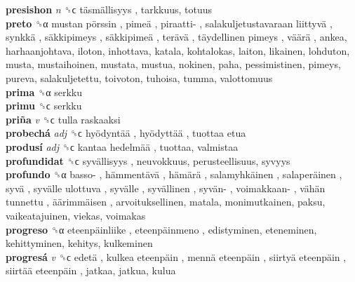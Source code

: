 \textbf{presishon} \emph{n}  ␝ϲ   täsmällisyys , tarkkuus, totuus  \\
\textbf{preto} ␝α   mustan pörssin ,  pimeä ,  piraatti- ,  salakuljetustavaraan liittyvä ,  synkkä ,  säkkipimeys ,  säkkipimeä ,  terävä ,  täydellinen pimeys ,  väärä , ankea, harhaanjohtava, iloton, inhottava, katala, kohtalokas, laiton, likainen, lohduton, musta, mustaihoinen, mustata, mustua, nokinen, paha, pessimistinen, pimeys, pureva, salakuljetettu, toivoton, tuhoisa, tumma, valottomuus  \\
\textbf{prima} ␝α  serkku  \\
\textbf{primu} ␝ϲ  serkku  \\
\textbf{priña} \emph{v}  ␝ϲ   tulla raskaaksi   \\
\textbf{probechá} \emph{adj}  ␝ϲ   hyödyntää ,  hyödyttää ,  tuottaa etua   \\
\textbf{produsí} \emph{adj}  ␝ϲ   kantaa hedelmää , tuottaa, valmistaa  \\
\textbf{profundidat} ␝ϲ   syvällisyys , neuvokkuus, perusteellisuus, syvyys  \\
\textbf{profundo} ␝α   basso- ,  hämmentävä ,  hämärä ,  salamyhkäinen ,  salaperäinen ,  syvä ,  syvälle ulottuva ,  syvälle ,  syvällinen ,  syvän- ,  voimakkaan- ,  vähän tunnettu ,  äärimmäisen , arvoituksellinen, matala, monimutkainen, paksu, vaikeatajuinen, viekas, voimakas  \\
\textbf{progreso} ␝α   eteenpäinliike ,  eteenpäinmeno , edistyminen, eteneminen, kehittyminen, kehitys, kulkeminen  \\
\textbf{progresá} \emph{v}  ␝ϲ   edetä ,  kulkea eteenpäin ,  mennä eteenpäin ,  siirtyä eteenpäin ,  siirtää eteenpäin , jatkaa, jatkua, kulua  \\
